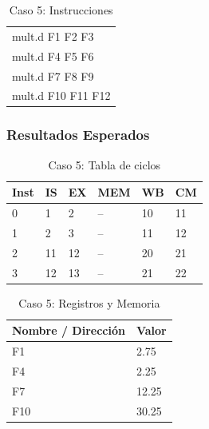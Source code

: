 \documentclass[a4paper]{article}
\begin{document}
	\begin{table}[H]
		\centering
		\caption*{Caso 5: Instrucciones}
		\begin{tabular}{l}
			mult.d F1 F2 F3 \\
			mult.d F4 F5 F6 \\
			mult.d F7 F8 F9 \\
			mult.d F10 F11 F12
		\end{tabular}
	\end{table}

	\subsubsection*{Resultados Esperados}

	\begin{table}[H]
		\centering
		\caption*{Caso 5: Tabla de ciclos}
		\begin{tabular}{|l|l|l|l|l|l|}
			\hline
			\textbf{Inst} & \textbf{IS} & \textbf{EX} & \textbf{MEM} & \textbf{WB} & \textbf{CM} \\ \hline
			0             & 1           & 2           & --           & 10          & 11          \\ \hline
			1             & 2           & 3           & --           & 11          & 12          \\ \hline
			2             & 11          & 12          & --           & 20          & 21          \\ \hline
			3             & 12          & 13          & --           & 21          & 22          \\ \hline
			\end{tabular}
	\end{table}

	\begin{table}[H]
		\centering
		\caption*{Caso 5: Registros y Memoria}
		\begin{tabular}{|l|l|}
			\hline
			\textbf{Nombre / Dirección} & \textbf{Valor} \\ \hline
			F1                          & 2.75           \\ \hline
			F4                          & 2.25           \\ \hline
			F7                          & 12.25          \\ \hline
			F10                         & 30.25          \\ \hline
		\end{tabular}
	\end{table}
\end{document}
